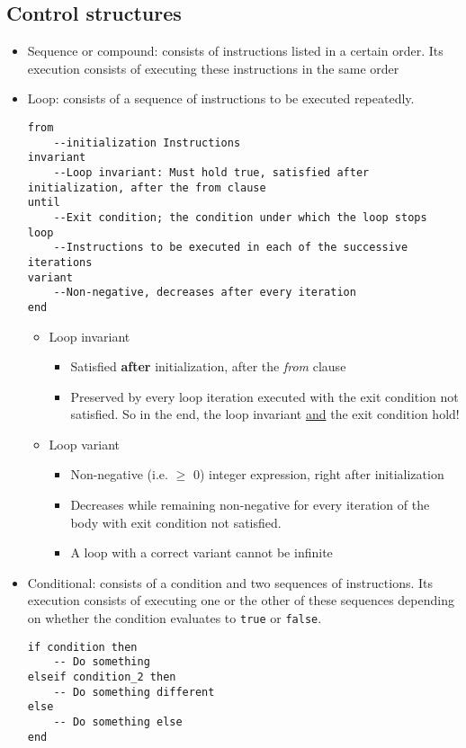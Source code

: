 \documentclass[a4paper]{article}
\newcommand{\inline}[1]{\lstinline!#1!}%
\begin{document}
\subsection{Control structures}
\begin{itemize}
\item Sequence or compound: consists of instructions listed in a certain order. Its execution consists of executing these instructions in the same order
\item Loop: consists of a sequence of instructions to be executed repeatedly.
\begin{lstlisting}
from
	--initialization Instructions
invariant
	--Loop invariant: Must hold true, satisfied after initialization, after the from clause
until
	--Exit condition; the condition under which the loop stops
loop
	--Instructions to be executed in each of the successive iterations
variant
	--Non-negative, decreases after every iteration
end
\end{lstlisting}
\begin{itemize}
\item Loop invariant
\begin{itemize}
\item Satisfied \textbf{after} initialization, after the \textsl{from} clause
\item Preserved by every loop iteration executed with the exit condition not satisfied. So in the end, the loop invariant \underline{and} the exit condition hold!
\end{itemize}
\item Loop variant
\begin{itemize}
\item Non-negative (i.e. $\geq$ 0) integer expression, right after initialization
\item Decreases while remaining non-negative for every iteration of the body with exit condition not satisfied. 
\item A loop with a correct variant cannot be infinite
\end{itemize}
\end{itemize}
\item Conditional: consists of a condition and two sequences of instructions. Its execution consists of executing one or the other of these sequences depending on whether the condition evaluates to \inline{true} or \inline{false}.
\begin{lstlisting}
if condition then
	-- Do something
elseif condition_2 then
	-- Do something different
else
	-- Do something else
end
\end{lstlisting}
\end{itemize}
\end{document}
